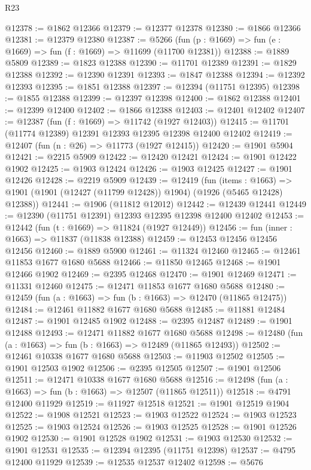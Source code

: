 \begin{lexlean}{R23}
\begin{coremodule}
@12378 := @1862 @12366
@12379 := @12377 @12378
@12380 := @1866 @12366
@12381 := @12379 @12380
@12387 := @5266 (fun (p : @1669) => fun (e : @1669) => fun (f : @1669) => @11699 (@11700 @12381))
@12388 := @1889 @5809
@12389 := @1823 @12388
@12390 := @11701 @12389
@12391 := @1829 @12388
@12392 := @12390 @12391
@12393 := @1847 @12388
@12394 := @12392 @12393
@12395 := @1851 @12388
@12397 := @12394 (@11751 @12395)
@12398 := @1855 @12388
@12399 := @12397 @12398
@12400 := @1862 @12388
@12401 := @12399 @12400
@12402 := @1866 @12388
@12403 := @12401 @12402
@12407 := @12387 (fun (f : @1669) => @11742 (@1927 @12403))
@12415 := @11701 (@11774 @12389) @12391 @12393 @12395 @12398 @12400 @12402
@12419 := @12407 (fun (n : @26) => @11773 (@1927 @12415))
@12420 := @1901 @5904
@12421 := @2215 @5909
@12422 := @12420 @12421
@12424 := @1901 @12422 @1902
@12425 := @1903 @12424
@12426 := @1903 @12425
@12427 := @1901 @12426
@12428 := @2219 @5909
@12439 := @12419
    (fun (items : @1663) =>
    @1901 (@1901 (@12427 (@11799 @12428)) @1904) (@1926 (@5465 @12428) @12388))
@12441 := @1906 (@11812 @12012)
@12442 := @12439 @12441
@12449 := @12390 (@11751 @12391) @12393 @12395 @12398 @12400 @12402
@12453 := @12442 (fun (t : @1669) => @11824 (@1927 @12449))
@12456 := fun (inner : @1663) => @11837 (@11838 @12388)
@12459 := @12453 @12456 @12456 @12456
@12460 := @1889 @5900
@12461 := @11324 @12460
@12465 := @12461 @11853 @1677 @1680 @5688
@12466 := @11850 @12465
@12468 := @1901 @12466 @1902
@12469 := @2395 @12468
@12470 := @1901 @12469
@12471 := @11331 @12460
@12475 := @12471 @11853 @1677 @1680 @5688
@12480 := @12459 (fun (a : @1663) => fun (b : @1663) => @12470 (@11865 @12475))
@12484 := @12461 @11882 @1677 @1680 @5688
@12485 := @11881 @12484
@12487 := @1901 @12485 @1902
@12488 := @2395 @12487
@12489 := @1901 @12488
@12493 := @12471 @11882 @1677 @1680 @5688
@12498 := @12480 (fun (a : @1663) => fun (b : @1663) => @12489 (@11865 @12493))
@12502 := @12461 @10338 @1677 @1680 @5688
@12503 := @11903 @12502
@12505 := @1901 @12503 @1902
@12506 := @2395 @12505
@12507 := @1901 @12506
@12511 := @12471 @10338 @1677 @1680 @5688
@12516 := @12498 (fun (a : @1663) => fun (b : @1663) => @12507 (@11865 @12511))
@12518 := @4791 @12400 @11929
@12519 := @11927 @12518
@12521 := @1901 @12519 @1904
@12522 := @1908 @12521
@12523 := @1903 @12522
@12524 := @1903 @12523
@12525 := @1903 @12524
@12526 := @1903 @12525
@12528 := @1901 @12526 @1902
@12530 := @1901 @12528 @1902
@12531 := @1903 @12530
@12532 := @1901 @12531
@12535 := @12394 @12395 (@11751 @12398)
@12537 := @4795 @12400 @11929
@12539 := @12535 @12537 @12402
@12598 := @5676

\end{coremodule}
\end{lexlean}
